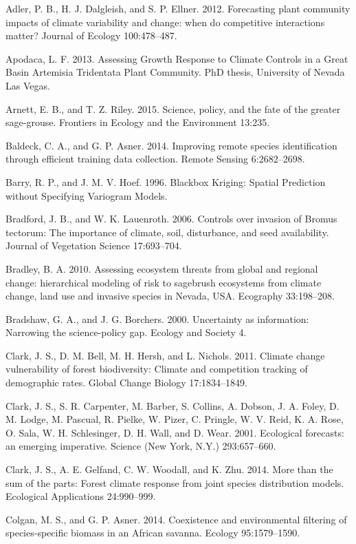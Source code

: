 \documentclass[12pt,]{article}
\begin{document}
Adler, P. B., H. J. Dalgleish, and S. P. Ellner. 2012. Forecasting plant
community impacts of climate variability and change: when do competitive
interactions matter? Journal of Ecology 100:478--487.

Apodaca, L. F. 2013. Assessing Growth Response to Climate Controls in a
Great Basin Artemisia Tridentata Plant Community. PhD thesis, University
of Nevada Las Vegas.

Arnett, E. B., and T. Z. Riley. 2015. Science, policy, and the fate of
the greater sage-grouse. Frontiers in Ecology and the Environment
13:235.

Baldeck, C. A., and G. P. Asner. 2014. Improving remote species
identification through efficient training data collection. Remote
Sensing 6:2682--2698.

Barry, R. P., and J. M. V. Hoef. 1996. Blackbox Kriging: Spatial
Prediction without Specifying Variogram Models.

Bradford, J. B., and W. K. Lauenroth. 2006. Controls over invasion of
Bromus tectorum: The importance of climate, soil, disturbance, and seed
availability. Journal of Vegetation Science 17:693--704.

Bradley, B. A. 2010. Assessing ecosystem threats from global and
regional change: hierarchical modeling of risk to sagebrush ecosystems
from climate change, land use and invasive species in Nevada, USA.
Ecography 33:198--208.

Bradshaw, G. A., and J. G. Borchers. 2000. Uncertainty as information:
Narrowing the science-policy gap. Ecology and Society 4.

Clark, J. S., D. M. Bell, M. H. Hersh, and L. Nichols. 2011. Climate
change vulnerability of forest biodiversity: Climate and competition
tracking of demographic rates. Global Change Biology 17:1834--1849.

Clark, J. S., S. R. Carpenter, M. Barber, S. Collins, A. Dobson, J. A.
Foley, D. M. Lodge, M. Pascual, R. Pielke, W. Pizer, C. Pringle, W. V.
Reid, K. A. Rose, O. Sala, W. H. Schlesinger, D. H. Wall, and D. Wear.
2001. Ecological forecasts: an emerging imperative. Science (New York,
N.Y.) 293:657--660.

Clark, J. S., A. E. Gelfand, C. W. Woodall, and K. Zhu. 2014. More than
the sum of the parts: Forest climate response from joint species
distribution models. Ecological Applications 24:990--999.

Colgan, M. S., and G. P. Asner. 2014. Coexistence and environmental
filtering of species-specific biomass in an African savanna. Ecology
95:1579--1590.
\end{document}
